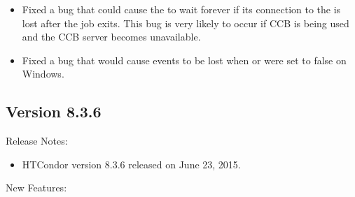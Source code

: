 \begin{itemize}
\item Fixed a bug that could cause the  to wait forever
if its connection to the  is lost after the job exits.
This bug is very likely to occur if CCB is being used and the CCB server
becomes unavailable.

\item Fixed a bug that would cause events to be lost when 
or  were set to false on Windows.

\end{itemize}

\subsection*{\label{sec:New-8-3-6}Version 8.3.6}

\noindent Release Notes:

\begin{itemize}

\item HTCondor version 8.3.6 released on June 23, 2015.

\end{itemize}


\noindent New Features:

